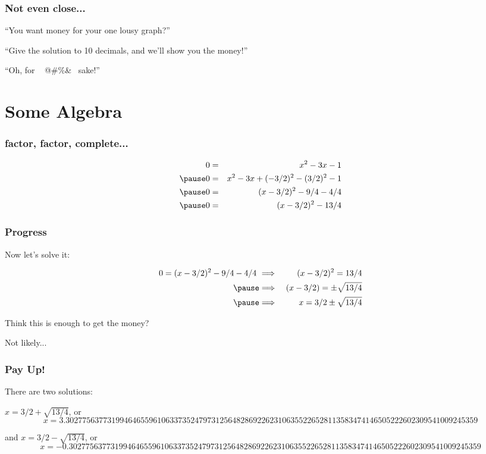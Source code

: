 \documentclass[
    10pt %
    16:9, %
]{beamer}
\begin{document}
 \frame %
{
  \frametitle{Not even close...}

``You want money for your one lousy graph?''

\pause

\bigskip

``Give the solution to 10 decimals, and we'll show you the money!''

\pause

\bigskip

``Oh, for  ~ @\#\%\*\&\@ ~ sake!''
}

\section{Some Algebra}

\frame %
{
  \frametitle{factor, factor, complete...}
 
 
\begin{eqnarray*}
 0 & = & x^2 -3x -1  \\ \pause
 0 & = &  x^2 -3x + (-3/2)^2 - (3/2)^2 -1  \\ \pause
 0 & = &  (x - 3/2)^2  -9/4 - 4/4  \\ \pause
 0 & = &   (x - 3/2)^2  -13/4  
\end{eqnarray*}

 

}

\frame %
{
  \frametitle{Progress}
 
 
Now let's solve it:

\begin{eqnarray*}
 0 =  (x - 3/2)^2  -9/4 - 4/4 ~ & \Longrightarrow &  ~ (x-3/2)^2 = 13/4 \\ \pause
 & \Longrightarrow &  ~ (x-3/2) = \pm \sqrt{13/4} \\ \pause
 & \Longrightarrow &  ~ x =  3/2\pm \sqrt{13/4} 
 \end{eqnarray*}
 
 \pause

Think this is enough to get the money?


\medskip
\pause

Not likely...

}

\frame %
{
  \frametitle{Pay Up!}
 
 There are two solutions: 
 
 \bigskip
 \pause
 
 $ x =  3/2 +  \sqrt{13/4}$, or
  $$x =  3.302775637731994646559610633735247973125648286922623106355226528113583474146 505222602309541009245359$$
  
  \bigskip
  \pause
  
and    $ x =  3/2 -  \sqrt{13/4}$, or
  $$x = -0.302775637731994646559610633735247973125648286922623106355226528113583474146505222602309541009245359$$

}
\end{document}
